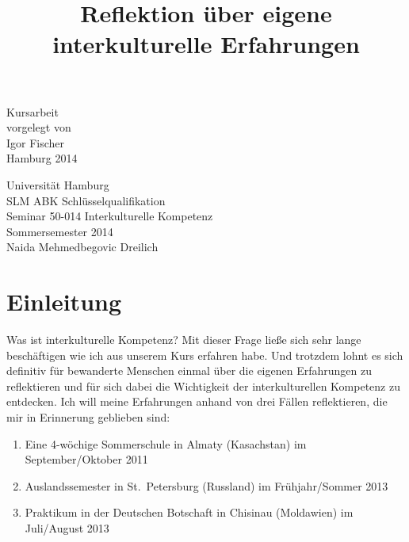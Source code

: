 \documentclass[12pt,headsepline,a4paper]{scrartcl}
\title{}
\author{}
\begin{document}
\begin{titlepage}
\date{}

\title{\Large Reflektion über eigene interkulturelle Erfahrungen}
{\let\newpage\relax\maketitle}

\begin{center}
\vfill
Kursarbeit\\
vorgelegt von\\
Igor Fischer \\
\null
Hamburg 2014
\vfill
\end{center}
\begin{minipage}{0.5\textwidth}
\begin{flushleft} 
Universität Hamburg\\
SLM ABK Schlüsselqualifikation\\
Seminar 50-014 Interkulturelle Kompetenz\\
Sommersemester 2014\\
Naida Mehmedbegovic Dreilich \\

\end{flushleft}
\end{minipage}
\vline
\begin{minipage}{0.5\textwidth}
\begin{flushright}
\end{flushright}

\end{minipage}

\end{titlepage}

\tableofcontents
\thispagestyle{empty}

\section*{Einleitung}

Was ist interkulturelle Kompetenz? Mit dieser Frage ließe sich sehr lange beschäftigen wie ich aus unserem Kurs erfahren habe. 
Und trotzdem lohnt es sich definitiv für bewanderte Menschen einmal über die eigenen Erfahrungen zu reflektieren und für sich dabei die Wichtigkeit der interkulturellen Kompetenz zu entdecken. 
Ich will meine Erfahrungen anhand von drei Fällen reflektieren, die mir in Erinnerung geblieben sind:
\begin{enumerate}
 \item Eine 4-wöchige Sommerschule in Almaty (Kasachstan) im September/Oktober 2011
  \item Auslandssemester in St.\ Petersburg (Russland) im Frühjahr/Sommer 2013
  \item Praktikum in der Deutschen Botschaft in Chisinau (Moldawien) im Juli/August 2013
\end{enumerate}
\end{document}
